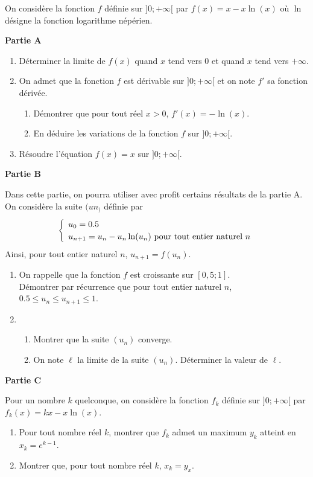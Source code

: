 \documentclass[11pt,fleqn, openany]{book} %
\begin{document}
%
\begin{exercise}[topic=log04, subtitle={(Métropole 2022)}]On considère la fonction $f$ définie sur $]0;+\infty[$ par $f(x)=x-x\ln(x)$ où $\ln$ désigne la fonction logarithme népérien.

\textbf{Partie A}

\begin{enumerate}
\item Déterminer la limite de $f(x)$ quand $x$ tend vers 0 et quand $x$ tend vers $+\infty$.
\item On admet que la fonction $f$ est dérivable sur $]0;+\infty[$ et on note $f'$ sa fonction dérivée.
\begin{enumerate}
\item Démontrer que pour tout réel $x>0$, $f'(x)=-\ln(x)$.
\item En déduire les variations de la fonction $f$ sur $]0;+\infty[$.
\end{enumerate}
\item Résoudre l'équation $f(x)=x$ sur $]0;+\infty[$.
\end{enumerate}

\textbf{Partie B}

Dans cette partie, on pourra utiliser avec profit certains résultats de la partie A.\\
On considère la suite $(un_)$ définie par
\[\left\{\renewcommand{\arraystretch}{1.2} \begin{array}{l}u_0=0.5 \\ u_{n+1}=u_n-u_n\ln(u_n) \text{ pour tout entier naturel }n

\end{array}\right.\]
Ainsi, pour tout entier naturel $n$, $u_{n+1}=f(u_n)$.
\begin{enumerate}
\item On rappelle que la fonction $f$ est croissante sur $[0,5;1]$.\\
Démontrer par récurrence que pour tout entier naturel $n$, $0.5\leqslant u_n \leqslant u_{n+1} \leqslant 1$.
\item \begin{enumerate}
\item Montrer que la suite $(u_n)$ converge.
\item On note $\ell$ la limite de la suite $(u_n)$. Déterminer la valeur de $\ell$.
\end{enumerate}
\end{enumerate}

\textbf{Partie C}

Pour un nombre $k$ quelconque, on considère la fonction $f_k$ définie sur $]0;+\infty[$ par $f_k(x)=kx-x\ln(x)$.
\begin{enumerate}
\item Pour tout nombre réel $k$, montrer que $f_k$ admet un maximum $y_k$ atteint en $x_k=e^{k-1}$.
\item Montrer que, pour tout nombre réel $k$, $x_k=y_x$.
\end{enumerate}\end{exercise}
\end{document}
